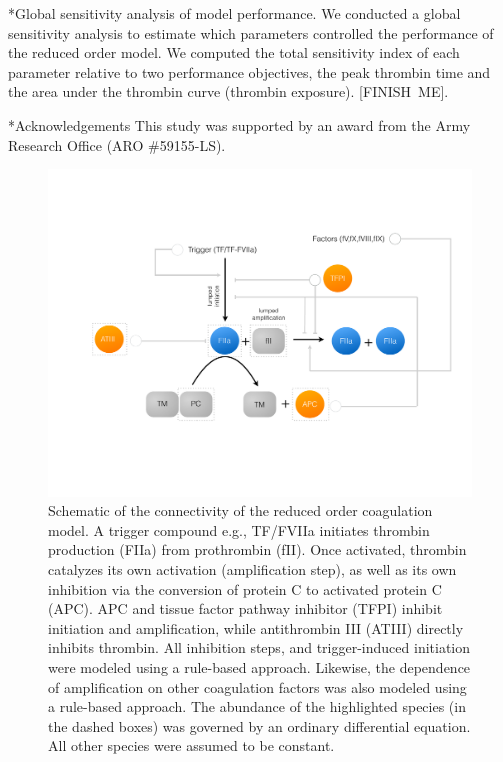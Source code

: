 \documentclass[12pt]{article}
\makeatletter
\renewcommand\subsection{\@startsection
	{subsection}{2}{0mm}
	{-0.05in}
	{-0.5\baselineskip}
	{\normalfont\normalsize\bfseries}}
\renewcommand\section{\@startsection
	{subsection}{2}{0mm}
	{-0.2in}
	{0.05\baselineskip}
	{\normalfont\large\bfseries}}
\makeatother
\begin{document}
\subsection*{Global sensitivity analysis of model performance.}
We conducted a global sensitivity analysis to estimate which parameters controlled the performance of the reduced order model. 
We computed the total sensitivity index of each parameter relative to two performance objectives, the peak thrombin time and the area under the thrombin curve 
(thrombin exposure). [FINISH~ME].

\section*{Acknowledgements}
This study was supported by an award from the Army Research Office (ARO \#59155-LS).

\clearpage
%
%




\clearpage

\begin{figure}
\centering
\includegraphics[width=1.0\textwidth]{./figs/Figure-1-Network.pdf}
\caption{Schematic of the connectivity of the reduced order coagulation model. A trigger compound e.g., TF/FVIIa initiates thrombin production (FIIa) from prothrombin (fII).
Once activated, thrombin catalyzes its own activation (amplification step), as well as its own inhibition via the conversion of protein C to activated protein C (APC).
APC and tissue factor pathway inhibitor (TFPI) inhibit initiation and amplification, while antithrombin III (ATIII) directly inhibits thrombin. 
All inhibition steps, and trigger-induced initiation were modeled using a rule-based approach. 
Likewise, the dependence of amplification on other coagulation factors was also modeled using a rule-based approach. 
The abundance of the highlighted species (in the dashed boxes) was governed by an ordinary differential equation. 
All other species were assumed to be constant.}\label{fig-network}
\end{figure}
\end{document}

